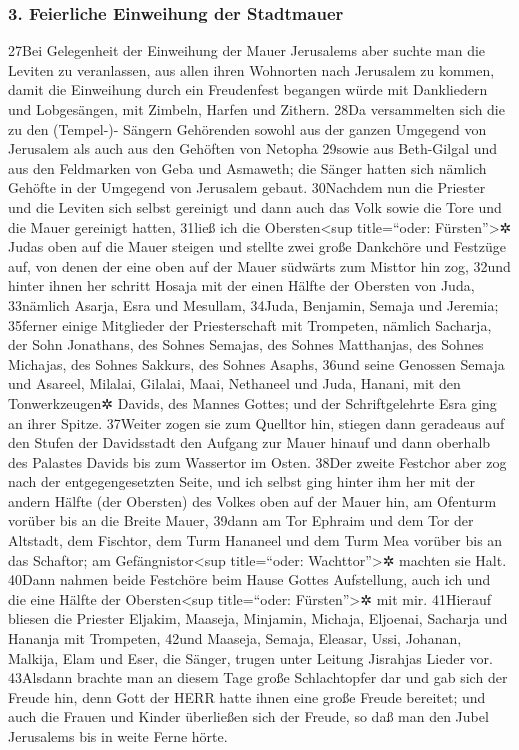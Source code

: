 \hypertarget{feierliche-einweihung-der-stadtmauer}{%
\subsubsection{3. Feierliche Einweihung der
Stadtmauer}\label{feierliche-einweihung-der-stadtmauer}}

27Bei Gelegenheit der Einweihung der Mauer Jerusalems aber suchte man
die Leviten zu veranlassen, aus allen ihren Wohnorten nach Jerusalem zu
kommen, damit die Einweihung durch ein Freudenfest begangen würde mit
Dankliedern und Lobgesängen, mit Zimbeln, Harfen und Zithern. 28Da
versammelten sich die zu den (Tempel-)- Sängern Gehörenden sowohl aus
der ganzen Umgegend von Jerusalem als auch aus den Gehöften von Netopha
29sowie aus Beth-Gilgal und aus den Feldmarken von Geba und Asmaweth;
die Sänger hatten sich nämlich Gehöfte in der Umgegend von Jerusalem
gebaut. 30Nachdem nun die Priester und die Leviten sich selbst gereinigt
und dann auch das Volk sowie die Tore und die Mauer gereinigt hatten,
31ließ ich die Obersten\textless sup title=``oder:
Fürsten''\textgreater✲ Judas oben auf die Mauer steigen und stellte zwei
große Dankchöre und Festzüge auf, von denen der eine oben auf der Mauer
südwärts zum Misttor hin zog, 32und hinter ihnen her schritt Hosaja mit
der einen Hälfte der Obersten von Juda, 33nämlich Asarja, Esra und
Mesullam, 34Juda, Benjamin, Semaja und Jeremia; 35ferner einige
Mitglieder der Priesterschaft mit Trompeten, nämlich Sacharja, der Sohn
Jonathans, des Sohnes Semajas, des Sohnes Matthanjas, des Sohnes
Michajas, des Sohnes Sakkurs, des Sohnes Asaphs, 36und seine Genossen
Semaja und Asareel, Milalai, Gilalai, Maai, Nethaneel und Juda, Hanani,
mit den Tonwerkzeugen✲ Davids, des Mannes Gottes; und der
Schriftgelehrte Esra ging an ihrer Spitze. 37Weiter zogen sie zum
Quelltor hin, stiegen dann geradeaus auf den Stufen der Davidsstadt den
Aufgang zur Mauer hinauf und dann oberhalb des Palastes Davids bis zum
Wassertor im Osten. 38Der zweite Festchor aber zog nach der
entgegengesetzten Seite, und ich selbst ging hinter ihm her mit der
andern Hälfte (der Obersten) des Volkes oben auf der Mauer hin, am
Ofenturm vorüber bis an die Breite Mauer, 39dann am Tor Ephraim und dem
Tor der Altstadt, dem Fischtor, dem Turm Hananeel und dem Turm Mea
vorüber bis an das Schaftor; am Gefängnistor\textless sup title=``oder:
Wachttor''\textgreater✲ machten sie Halt. 40Dann nahmen beide Festchöre
beim Hause Gottes Aufstellung, auch ich und die eine Hälfte der
Obersten\textless sup title=``oder: Fürsten''\textgreater✲ mit mir.
41Hierauf bliesen die Priester Eljakim, Maaseja, Minjamin, Michaja,
Eljoenai, Sacharja und Hananja mit Trompeten, 42und Maaseja, Semaja,
Eleasar, Ussi, Johanan, Malkija, Elam und Eser, die Sänger, trugen unter
Leitung Jisrahjas Lieder vor. 43Alsdann brachte man an diesem Tage große
Schlachtopfer dar und gab sich der Freude hin, denn Gott der HERR hatte
ihnen eine große Freude bereitet; und auch die Frauen und Kinder
überließen sich der Freude, so daß man den Jubel Jerusalems bis in weite
Ferne hörte.

